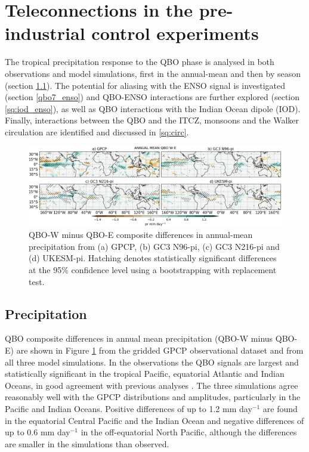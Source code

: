   
\section{Teleconnections in the pre-industrial control experiments}\label{sq:cmip6_qbo}

The tropical precipitation response to the QBO phase is analysed in both observations and model simulations, first in the annual-mean and then by season (section \ref{qbo7_pr}).  The potential for aliasing with the ENSO signal is investigated (section \ref{qbo7_enso}) and QBO-ENSO interactions are further explored (section \ref{sq:iod_enso}), as well as QBO interactions with the Indian Ocean dipole (IOD). Finally, interactions between the QBO and the ITCZ, monsoons and the Walker circulation are identified and discussed in \ref{sq:circ}. 

\begin{figure}[t!]
\centering
 \includegraphics[width=\linewidth]{figures/piprclimqbowqboe.png}
\caption[Annual mean precipitation composite difference QBO W-E ]{ QBO-W minus QBO-E composite differences in annual-mean precipitation from (a) GPCP, (b) GC3 N96-pi, (c) GC3 N216-pi and (d) UKESM-pi. Hatching denotes statistically significant differences at the 95\% confidence level using a bootstrapping with replacement test. }
\label{fig:qboclim}
\end{figure}


\subsection{Precipitation} \label{qbo7_pr}

QBO composite differences in annual mean precipitation (QBO-W minus QBO-E) are shown in Figure \ref{fig:qboclim} from the gridded GPCP observational dataset and from all three model simulations. In the observations the QBO signals are largest and statistically significant in the tropical Pacific, equatorial Atlantic and Indian Oceans, in good agreement with previous analyses \citep{liess2012,gray2018}. The three simulations agree reasonably well with the GPCP distributions and amplitudes, particularly in the Pacific and Indian Oceans. Positive differences of up to 1.2 mm day$^{-1}$ are found in the equatorial Central Pacific and the Indian Ocean and negative differences of up to 0.6 mm day$^{-1}$ in the off-equatorial North Pacific, although the differences are smaller in the simulations than observed. 

